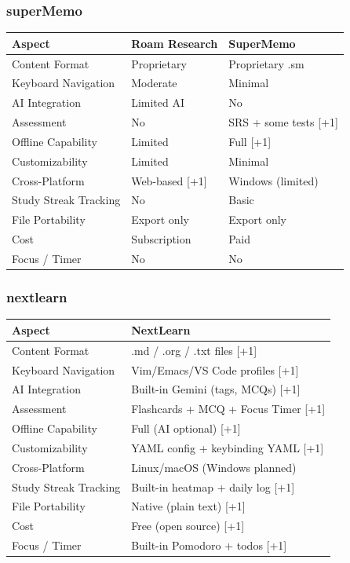 \documentclass[14pt]{article}
\begin{document}
\newpage
\subsubsection{superMemo}
\label{sec:org4a24664}
\begin{center}
\begin{tabular}{lll}
Aspect & Roam Research & SuperMemo\\
\hline
Content Format & Proprietary & Proprietary .sm\\
Keyboard Navigation & Moderate & Minimal\\
AI Integration & Limited AI & No\\
Assessment & No & SRS + some tests [+1]\\
Offline Capability & Limited & Full [+1]\\
Customizability & Limited & Minimal\\
Cross-Platform & Web-based [+1] & Windows (limited)\\
Study Streak Tracking & No & Basic\\
File Portability & Export only & Export only\\
Cost & Subscription & Paid\\
Focus / Timer & No & No\\
\end{tabular}
\end{center}
\subsubsection{nextlearn}
\label{sec:org7185e6d}
\begin{center}
\begin{tabular}{ll}
Aspect & NextLearn\\
\hline
Content Format & .md / .org / .txt files [+1]\\
Keyboard Navigation & Vim/Emacs/VS Code profiles [+1]\\
AI Integration & Built-in Gemini (tags, MCQs) [+1]\\
Assessment & Flashcards + MCQ + Focus Timer [+1]\\
Offline Capability & Full (AI optional)  [+1]\\
Customizability & YAML config + keybinding YAML [+1]\\
Cross-Platform & Linux/macOS (Windows planned)\\
Study Streak Tracking & Built-in heatmap + daily log [+1]\\
File Portability & Native (plain text) [+1]\\
Cost & Free (open source) [+1]\\
Focus / Timer & Built-in Pomodoro + todos [+1]\\
\end{tabular}
\end{center}
\end{document}
